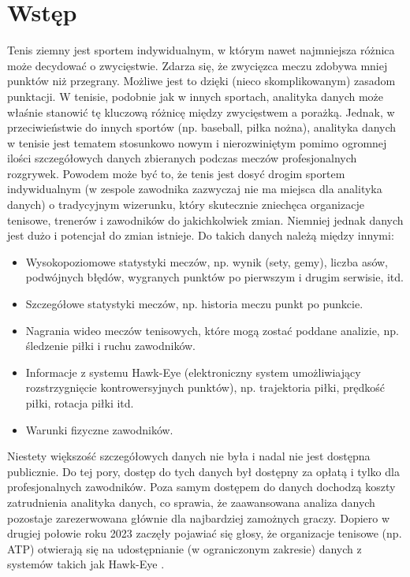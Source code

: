 \documentclass[12pt, a4paper]{article}
\begin{document}
\section{Wstęp}
Tenis ziemny jest sportem indywidualnym, w którym nawet najmniejsza różnica może decydować o zwycięstwie. Zdarza się, że zwycięzca meczu zdobywa mniej punktów niż przegrany. Możliwe jest to dzięki (nieco skomplikowanym) zasadom punktacji. W tenisie, podobnie jak w innych sportach, analityka danych może właśnie stanowić tę kluczową różnicę między zwycięstwem a porażką. Jednak, w przeciwieństwie do innych sportów (np. baseball, piłka nożna), analityka danych w tenisie jest tematem stosunkowo nowym i nierozwiniętym pomimo ogromnej ilości szczegółowych danych zbieranych podczas meczów profesjonalnych rozgrywek. Powodem może być to, że tenis jest dosyć drogim sportem indywidualnym (w zespole zawodnika zazwyczaj nie ma miejsca dla analityka danych) o tradycyjnym wizerunku, który skutecznie zniechęca organizacje tenisowe, trenerów i zawodników do jakichkolwiek zmian. Niemniej jednak danych jest dużo i potencjał do zmian istnieje. Do takich danych należą między innymi:
\begin{itemize}
    \item Wysokopoziomowe statystyki meczów, np. wynik (sety, gemy), liczba asów, podwójnych błędów, wygranych punktów po pierwszym i drugim serwisie, itd.
    \item Szczegółowe statystyki meczów, np. historia meczu punkt po punkcie.
    \item Nagrania wideo meczów tenisowych, które mogą zostać poddane analizie, np. śledzenie piłki i ruchu zawodników.
    \item Informacje z systemu Hawk-Eye (elektroniczny system umożliwiający rozstrzygnięcie kontrowersyjnych punktów), np. trajektoria piłki, prędkość piłki, rotacja piłki itd.
    \item Warunki fizyczne zawodników.
\end{itemize}
Niestety większość szczegółowych danych nie była i nadal nie jest dostępna publicznie. Do tej pory, dostęp do tych danych był dostępny za opłatą i tylko dla profesjonalnych zawodników. Poza samym dostępem do danych dochodzą koszty zatrudnienia analityka danych, co sprawia, że zaawansowana analiza danych pozostaje zarezerwowana głównie dla najbardziej zamożnych graczy. Dopiero w drugiej połowie roku 2023 zaczęły pojawiać się głosy, że organizacje tenisowe (np. ATP) otwierają się na udostępnianie (w ograniczonym zakresie) danych z systemów takich jak Hawk-Eye \cite{the_telegraph}.
\end{document}
